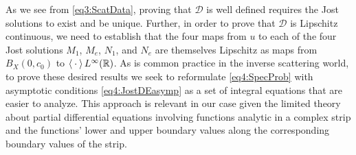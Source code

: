 \documentclass[../dissertation.tex]{subfiles}
\begin{document}
As we see from \eqref{eq3:ScatData}, proving that $\mathscr D$ is well defined 
requires the Jost solutions to exist and be unique. Further, in order to prove 
that $\mathscr D$ is Lipschitz continuous, we need to establish that 
the four maps from $u$ to each of the four Jost solutions $M_1$, $M_e$, $N_1$, 
and $N_e$ are themselves Lipschitz as maps from $B_X(0, c_0)$ to 
$\left\langle \kern 0.5ex \cdot \kern 0.5ex \right\rangle L^\infty(\mathbb R)$. As is common practice in the inverse 
scattering world, to prove these desired results we seek to reformulate 
\eqref{eq4:SpecProb} with asymptotic conditions \eqref{eq4:JostDEasymp} as a set 
of integral equations that are easier to analyze. This approach is relevant in 
our case given the limited theory about partial dif{}ferential equations 
involving functions analytic in a complex strip and the functions' lower and 
upper boundary values along the corresponding boundary values of the strip.
\end{document}
